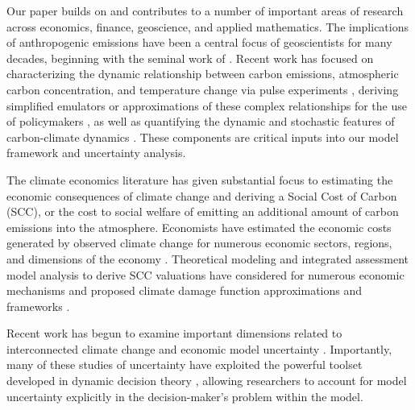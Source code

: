 \documentclass[12pt]{article}
\begin{document}
Our paper builds on and contributes to a number of important areas of research across economics, finance, geoscience, and applied mathematics. The implications of anthropogenic emissions have been a central focus of geoscientists for many decades, beginning with the seminal work of \cite{Arrhenius:1896}. Recent work has focused on characterizing the dynamic relationship between carbon emissions, atmospheric carbon concentration, and temperature change via pulse experiments \citep{Joosetal:2013, Geoffroy:2013, Ebyetal:2009}, deriving simplified emulators or approximations of these complex relationships for the use of policymakers \citep{MatthewsGillettScott:2009, Pierrehumbert:2014, MacDougallSwartKnutti:2017}, as well as quantifying the dynamic and stochastic features of carbon-climate dynamics \citep{RickeCaldeira:2014, PalmerStevens:2019}. These components are critical inputs into our model framework and uncertainty analysis.

The climate economics literature has given substantial focus to estimating the economic consequences of climate change and deriving a Social Cost of Carbon (SCC), or the cost to social welfare of emitting an additional amount of carbon emissions into the atmosphere. Economists have estimated the economic costs generated by observed climate change for numerous economic sectors, regions, and dimensions of the economy \citep{dell2012temperature, Hsiangetal:2017, colacito2019temperature, IPCC:2019, CareltonGreenstone:2021}. Theoretical modeling and integrated assessment model analysis to derive SCC valuations have considered for numerous economic mechanisms \citep{Golosovetal:2014, Acemogluetal:2016, Nordhaus:2018, CaiJuddLontzek:2017, CaiLontzek:2019} and proposed climate damage function approximations and frameworks \citep{Lentonetal:2008, Weitzman:2012, Caietal:2015, Drijfhoutetal:2015, Ritchieetal:2021}. 

Recent work has begun to examine important dimensions related to interconnected climate change and economic model uncertainty \citep{Olsonetal:2012, LemoineTraeger:2014, HasslerKrusellOlovsson:2018, Nordhaus:2018, DietzVenmans:2019, BarnettBrockHansen:2020, Rudik:2020, BarnettBrockHansen:2021, barnett2023climate}. Importantly, many of these studies of uncertainty have exploited the powerful toolset developed in dynamic decision theory \citep{AndersonHansenSargent:2003, MaccheroniMarinacciRustichini:2006, HansenSargent:2007, KlibanoffMarinacciMukerji:2009, HansenMiao:2018, BarnettBrockHansen:2020, Cerreia-Vioglioetal:2021}, allowing researchers to account for model uncertainty explicitly in the decision-maker's problem within the model.
\end{document}
